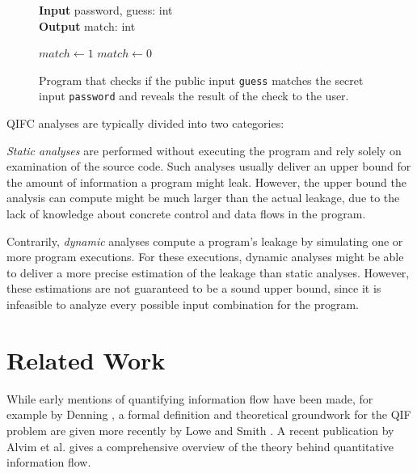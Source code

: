 \begin{figure}
\centering
\begin{minipage}{.7\linewidth}
    \begin{algorithm}[H]
        \hspace*{\algorithmicindent} \textbf{Input} password, guess: int \\
        \hspace*{\algorithmicindent} \textbf{Output} match: int
        \begin{algorithmic}[1]
                \State $match \leftarrow 1$
            \Else
                \State $match \leftarrow 0$
            \EndIf
    \end{algorithmic} 
    \end{algorithm}
    \end{minipage}
    \caption{Program that checks if the public input \texttt{guess} matches the secret input \texttt{password} and reveals the result of the check to the user.}
    \label{fig:pwChecker}
\end{figure}

QIFC analyses are typically divided into two categories:

\emph{Static analyses} are performed without executing the program and rely solely on examination of the source code. Such analyses usually deliver an upper bound for the amount of information a program might leak. However, the upper bound the analysis can compute might be much larger than the actual leakage, due to the lack of knowledge about concrete control and data flows in the program.

Contrarily, \emph{dynamic} analyses compute a program's leakage by simulating one or more program executions. For these executions, dynamic analyses might be able to deliver a more precise estimation of the leakage than static analyses. However, these estimations are not guaranteed to be a sound upper bound, since it is infeasible to analyze every possible input combination for the program.

\section{Related Work}\label{sec:relWork}

While early mentions of quantifying information flow have been made, for example by Denning \cite{denning82}, a formal definition and theoretical groundwork for the QIF problem are given more recently by Lowe \cite{lowe02} and Smith \cite{smith09}. A recent publication by Alvim et al. \cite{alvim19} gives a comprehensive overview of the theory behind quantitative information flow.

